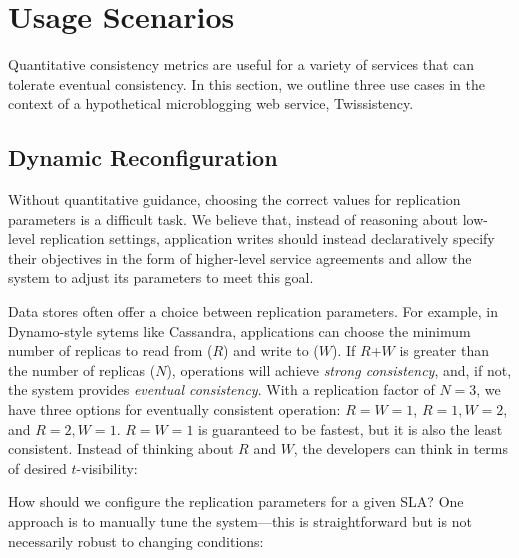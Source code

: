 \section{Usage Scenarios}
\label{sec:scenarios}

Quantitative consistency metrics are useful for a variety of services
that can tolerate eventual consistency. In this section, we outline
three use cases in the context of a hypothetical microblogging web
service, Twissistency.

\subsection{Dynamic Reconfiguration}
\label{sec:dynamic}

Without quantitative guidance, choosing the correct values for
replication parameters is a difficult task. We believe that, instead
of reasoning about low-level replication settings, application writes
should instead declaratively specify their objectives in the form of
higher-level service agreements and allow the system to adjust its
parameters to meet this goal.

Data stores often offer a choice between replication parameters. For
example, in Dynamo-style sytems like Cassandra, applications can
choose the minimum number of replicas to read from ($R$) and write to
($W$). If $R$+$W$ is greater than the number of replicas ($N$),
operations will achieve \textit{strong consistency}, and, if not, the
system provides \textit{eventual consistency}. With a replication
factor of $N=3$, we have three options for eventually consistent
operation: $R$$=$$W$$=$$1$, $R$$=$$1$$, W$$=$$2$, and $R$$=$$2$$,
W$$=$$1$.  $R$$=$$W$$=$$1$ is guaranteed to be fastest, but it is also
the least consistent. Instead of thinking about $R$ and $W$, the
developers can think in terms of desired $t$-visibility:


How should we configure the replication parameters for a given SLA?
One approach is to manually tune the system---this is straightforward
but is not necessarily robust to changing conditions:


